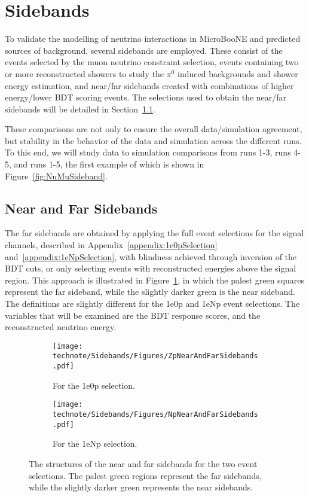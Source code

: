 \newpage
\section{Sidebands}
\label{sec:sidebands}

To validate the modelling of neutrino interactions in MicroBooNE and predicted sources of background, several sidebands are employed. These consist of the events selected by the muon neutrino constraint selection, events containing two or more reconstructed showers to study the $\pi^0$ induced backgrounds and shower energy estimation, and near/far sidebands created with combinations of higher energy/lower BDT scoring events. The selections used to obtain the near/far sidebands will be detailed in Section~\ref{sec:NearAndFarSideband}.

These comparisons are not only to ensure the overall data/simulation agreement, but stability in the behavior of the data and simulation across the different runs. To this end, we will study data to simulation comparisons from runs 1-3, runs 4-5, and runs 1-5, the first example of which is shown in Figure~\ref{fig:NuMuSideband}. 




\subsection{Near and Far Sidebands}
\label{sec:NearAndFarSideband}

The far sidebands are obtained by applying the full event selections for the signal channels, described in Appendix~\ref{appendix:1e0pSelection} and~\ref{appendix:1eNpSelection}, with blindness achieved through inversion of the BDT cuts, or only selecting events with reconstructed energies above the signal region. This approach is illustrated in Figure~\ref{fig:SidebandStructure}, in which the palest green squares represent the far sideband, while the slightly darker green is the near sideband. The definitions are slightly different for the 1e0p and 1eNp event selections. The variables that will be examined are the BDT response scores, and the reconstructed neutrino energy.

\begin{figure}[H]
    \centering
    \begin{subfigure}{0.5\linewidth}
        \texttt{[image: technote/Sidebands/Figures/ZpNearAndFarSidebands.pdf]}
        \caption{For the 1e0p selection.}
    \end{subfigure}%
    \begin{subfigure}{0.5\linewidth}
        \texttt{[image: technote/Sidebands/Figures/NpNearAndFarSidebands.pdf]}
        \caption{For the 1eNp selection.}
    \end{subfigure}
    \caption{The structures of the near and far sidebands for the two event selections. The palest green regions represent the far sidebands, while the slightly darker green represents the near sidebands.}
    \label{fig:SidebandStructure}
\end{figure}





%